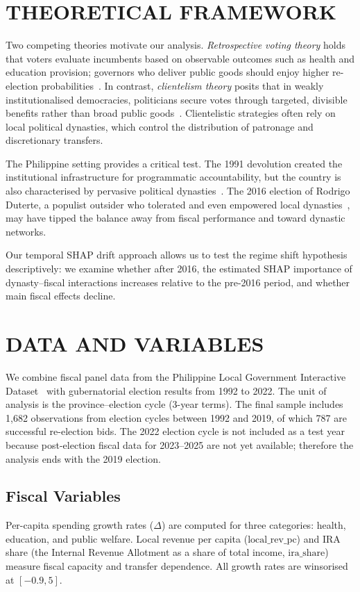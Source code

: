 \documentclass[conference]{IEEEtran}
\begin{document}
\section{THEORETICAL FRAMEWORK}

Two competing theories motivate our analysis. \textit{Retrospective voting theory} holds that voters evaluate incumbents based on observable outcomes such as health and education provision; governors who deliver public goods should enjoy higher re-election probabilities~\cite{stokes2005}. In contrast, \textit{clientelism theory} posits that in weakly institutionalised democracies, politicians secure votes through targeted, divisible benefits rather than broad public goods~\cite{hicken2011}. Clientelistic strategies often rely on local political dynasties, which control the distribution of patronage and discretionary transfers.

The Philippine setting provides a critical test. The 1991 devolution created the institutional infrastructure for programmatic accountability, but the country is also characterised by pervasive political dynasties~\cite{mendoza2016}. The 2016 election of Rodrigo Duterte, a populist outsider who tolerated and even empowered local dynasties~\cite{curato2016}, may have tipped the balance away from fiscal performance and toward dynastic networks.

Our temporal SHAP drift approach allows us to test the regime shift hypothesis descriptively: we examine whether after 2016, the estimated SHAP importance of dynasty–fiscal interactions increases relative to the pre-2016 period, and whether main fiscal effects decline.

\section{DATA AND VARIABLES}

We combine fiscal panel data from the Philippine Local Government Interactive Dataset~\cite{panao} with gubernatorial election results from 1992 to 2022. The unit of analysis is the province–election cycle (3-year terms). The final sample includes 1,682 observations from election cycles between 1992 and 2019, of which 787 are successful re-election bids. The 2022 election cycle is not included as a test year because post-election fiscal data for 2023–2025 are not yet available; therefore the analysis ends with the 2019 election.

\subsection{Fiscal Variables}
Per-capita spending growth rates ($\Delta$) are computed for three categories: health, education, and public welfare. Local revenue per capita ($\text{local\_rev\_pc}$) and IRA share (the Internal Revenue Allotment as a share of total income, $\text{ira\_share}$) measure fiscal capacity and transfer dependence. All growth rates are winsorised at $[-0.9, 5]$.
\end{document}
